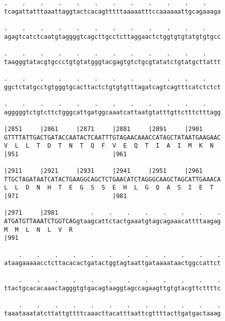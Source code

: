 \documentclass{article}
\begin{document}
\begin{Verbatim}
.    .    .    .    .    .    .    .    .    .    .    .    
tcagattatttaaattaggtactcacagtttttaaaaatttccaaaaaattgcagaaaga
                                                            
.    .    .    .    .    .    .    .    .    .    .    .    
agagtcatctcaatgtaggggtcagcttgcctcttaggaactctggtgtgtatgtgtgcc
                                                            
.    .    .    .    .    .    .    .    .    .    .    .    
taagggtatacgtgccctgtgtatgggtacgagtgtctgcgtatatctgtatgcttattt
                                                            
.    .    .    .    .    .    .    .    .    .    .    .    
ggctctatgcctgtgggtgcacttactctgtgtgtttagatcagtcagtttcatctctct
                                                            
.    .    .    .    .    .    .    .    .    .    .    .    
agggggtctgtcttctgggcattgatggcaaatcattaatgtatttgttctttctttagg
                                                            
|2851     |2861     |2871     |2881     |2891     |2901     
GTTTTATTGACTGATACCAATACTCAATTTGTAGAACAAACCATAGCTATAATGAAGAAC
V  L  L  T  D  T  N  T  Q  F  V  E  Q  T  I  A  I  M  K  N  
|951                          |961                          
  
|2911     |2921     |2931     |2941     |2951     |2961     
TTGCTAGATAATCATACTGAAGGCAGCTCTGAACATCTAGGGCAAGCTAGCATTGAAACA
L  L  D  N  H  T  E  G  S  S  E  H  L  G  Q  A  S  I  E  T  
|971                          |981                          
  
|2971     |2981         .    .    .    .    .    .    .    .
ATGATGTTAAATCTGGTCAGgtaagcattctactgaaatgtagcagaaacattttaagag
M  M  L  N  L  V  R                                         
|991                                                        
  
    .    .    .    .    .    .    .    .    .    .    .    .
ataagaaaaacctcttacacactgatactggtagtaattgataaaataactggccattct
                                                            
    .    .    .    .    .    .    .    .    .    .    .    .
ttactgcacacaaactagggtgtgacagtaaggtagccagaagttgtgtacgttcttttc
                                                            
    .    .    .    .    .    .    .    .    .    .    .    .
taaataaatatcttattgttttcaaacttacatttaattcgttttacttgatgactaaag
                                                            

\end{Verbatim}
\end{document}

